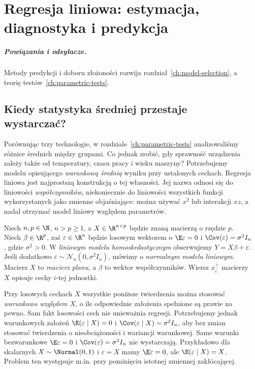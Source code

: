\chapter{Regresja liniowa: estymacja, diagnostyka i predykcja}
\label{ch:linear-regression}
\paragraph{Powiązania i odsyłacze.} Metody predykcji i doboru złożoności rozwija rozdział~\ref{ch:model-selection}, a teorię testów~\ref{ch:parametric-tests}.


\section{Kiedy statystyka średniej przestaje wystarczać?}
Porównując trzy technologie, w rozdziale~\ref{ch:parametric-tests}
analizowaliśmy różnice średnich między grupami. Co jednak zrobić, gdy
sprawność urządzenia zależy także od temperatury, czasu pracy i wieku
maszyny? Potrzebujemy modelu opisującego \emph{warunkową średnią}
wyniku przy ustalonych cechach. Regresja liniowa jest najprostszą
konstrukcją o tej własności. Jej nazwa odnosi się do liniowości
\emph{współczynników}, niekoniecznie do liniowości wszystkich funkcji
wykorzystanych jako zmienne objaśniające: można używać $x^2$ lub
interakcji $xz$, a nadal otrzymać model liniowy względem parametrów.

\begin{definicja}
\label{def:linear-fixed}
Niech $n,p\in\N$, $n>p\ge1$, a
$X\in\R^{n\times p}$ będzie znaną macierzą o rzędzie $p$.
Niech $\beta\in\R^p$, zaś $\varepsilon\in\R^n$ będzie
losowym wektorem o $\E\varepsilon=0$ i
$\Cov(\varepsilon)=\sigma^2I_n$, gdzie $\sigma^2>0$.
W \emph{liniowym modelu homoskedastycznym} obserwujemy
$Y=X\beta+\varepsilon$. Jeśli dodatkowo
$\varepsilon\sim\mathcal N_n(0,\sigma^2I_n)$, mówimy o
\emph{normalnym modelu liniowym}. Macierz $X$ to
\emph{macierz planu}, a $\beta$ to wektor współczynników.
Wiersz $x_i^\top$ macierzy $X$ opisuje cechy $i$-tej jednostki.
\end{definicja}

Przy losowych cechach $X$ wszystkie poniższe twierdzenia można
stosować \emph{warunkowo względem $X$}, o ile odpowiednie założenia
spełnione są prawie na pewno. Sam fakt losowości cech nie unieważnia
regresji. Potrzebujemy jednak warunkowych założeń
$\E(\varepsilon\mid X)=0$ i
$\Cov(\varepsilon\mid X)=\sigma^2I_n$,
aby bez zmian stosować twierdzenia o nieobciążoności
i wariancji warunkowej. Same warunki bezwarunkowe
$\E\varepsilon=0$ i $\Cov(\varepsilon)=\sigma^2I_n$
nie wystarczają. Przykładowo dla skalarnych
$X\sim\Normal(0,1)$ i $\varepsilon=X$ mamy
$\E\varepsilon=0$, ale $\E(\varepsilon\mid X)=X$.
Problem ten występuje m.in. przy pominięciu
istotnej zmiennej zakłócającej.

